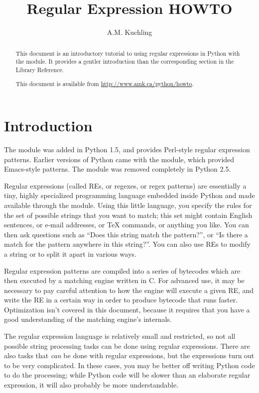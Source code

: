 \documentclass{howto}
\title{Regular Expression HOWTO}
\author{A.M. Kuchling}
\begin{document}
\maketitle

\begin{abstract}
\noindent
This document is an introductory tutorial to using regular expressions
in Python with the  module.  It provides a gentler
introduction than the corresponding section in the Library Reference.

This document is available from 
\url{http://www.amk.ca/python/howto}.

\end{abstract}

\tableofcontents

\section{Introduction}

The  module was added in Python 1.5, and provides
Perl-style regular expression patterns.  Earlier versions of Python
came with the  module, which provided Emacs-style
patterns.  The  module was removed completely in Python 2.5.

Regular expressions (called REs, or regexes, or regex patterns) are
essentially a tiny, highly specialized programming language embedded
inside Python and made available through the  module.
Using this little language, you specify the rules for the set of
possible strings that you want to match; this set might contain
English sentences, or e-mail addresses, or TeX commands, or anything
you like.  You can then ask questions such as ``Does this string match
the pattern?'', or ``Is there a match for the pattern anywhere in this
string?''.  You can also use REs to modify a string or to split it
apart in various ways.

Regular expression patterns are compiled into a series of bytecodes
which are then executed by a matching engine written in C.  For
advanced use, it may be necessary to pay careful attention to how the
engine will execute a given RE, and write the RE in a certain way in
order to produce bytecode that runs faster.  Optimization isn't
covered in this document, because it requires that you have a good
understanding of the matching engine's internals.

The regular expression language is relatively small and restricted, so
not all possible string processing tasks can be done using regular
expressions.  There are also tasks that \emph{can} be done with
regular expressions, but the expressions turn out to be very
complicated.  In these cases, you may be better off writing Python
code to do the processing; while Python code will be slower than an
elaborate regular expression, it will also probably be more understandable.
\end{document}
